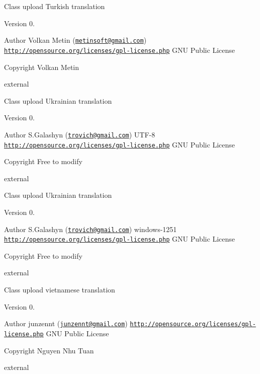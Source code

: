 Class upload Turkish translation

\begin{DoxyVersion}{Version}
0. 
\end{DoxyVersion}
\begin{DoxyAuthor}{Author}
Volkan Metin (\href{mailto:metinsoft@gmail.com}{\tt metinsoft@gmail.\+com})  \href{http://opensource.org/licenses/gpl-license.php}{\tt http\+://opensource.\+org/licenses/gpl-\/license.\+php} G\+N\+U Public License 
\end{DoxyAuthor}
\begin{DoxyCopyright}{Copyright}
Volkan Metin
\end{DoxyCopyright}
external

Class upload Ukrainian translation

\begin{DoxyVersion}{Version}
0. 
\end{DoxyVersion}
\begin{DoxyAuthor}{Author}
S.\+Galashyn (\href{mailto:trovich@gmail.com}{\tt trovich@gmail.\+com})  U\+T\+F-\/8  \href{http://opensource.org/licenses/gpl-license.php}{\tt http\+://opensource.\+org/licenses/gpl-\/license.\+php} G\+N\+U Public License 
\end{DoxyAuthor}
\begin{DoxyCopyright}{Copyright}
Free to modify
\end{DoxyCopyright}
external

Class upload Ukrainian translation

\begin{DoxyVersion}{Version}
0. 
\end{DoxyVersion}
\begin{DoxyAuthor}{Author}
S.\+Galashyn (\href{mailto:trovich@gmail.com}{\tt trovich@gmail.\+com})  windows-\/1251  \href{http://opensource.org/licenses/gpl-license.php}{\tt http\+://opensource.\+org/licenses/gpl-\/license.\+php} G\+N\+U Public License 
\end{DoxyAuthor}
\begin{DoxyCopyright}{Copyright}
Free to modify
\end{DoxyCopyright}
external

Class upload vietnamese translation

\begin{DoxyVersion}{Version}
0. 
\end{DoxyVersion}
\begin{DoxyAuthor}{Author}
junzennt (\href{mailto:junzennt@gmail.com}{\tt junzennt@gmail.\+com})  \href{http://opensource.org/licenses/gpl-license.php}{\tt http\+://opensource.\+org/licenses/gpl-\/license.\+php} G\+N\+U Public License 
\end{DoxyAuthor}
\begin{DoxyCopyright}{Copyright}
Nguyen Nhu Tuan
\end{DoxyCopyright}
external

